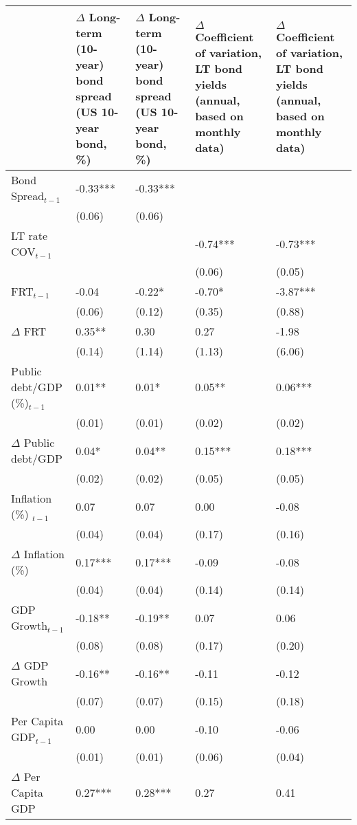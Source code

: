 \begingroup\tiny
\begin{tabular}{lp{3cm}p{3cm}p{3cm}p{3cm}}
  \hline
 & $\Delta$ Long-term (10-year) bond spread (US 10-year bond, \%) & $\Delta$ Long-term (10-year) bond spread (US 10-year bond, \%) & $\Delta$ Coefficient of variation, LT bond yields (annual, based on monthly data) & $\Delta$ Coefficient of variation, LT bond yields (annual, based on monthly data) \\ 
  \hline
Bond Spread$_{t-1}$ & -0.33*** & -0.33*** &  &  \\ 
   & (0.06) & (0.06) &  &  \\ 
  LT rate COV$_{t-1}$ &  &  & -0.74*** & -0.73*** \\ 
   &  &  & (0.06) & (0.05) \\ 
  FRT$_{t-1}$ & -0.04 & -0.22* & -0.70* & -3.87*** \\ 
   & (0.06) & (0.12) & (0.35) & (0.88) \\ 
  $\Delta$ FRT & 0.35** & 0.30 & 0.27 & -1.98 \\ 
   & (0.14) & (1.14) & (1.13) & (6.06) \\ 
  Public debt/GDP (\%)$_{t-1}$ & 0.01** & 0.01* & 0.05** & 0.06*** \\ 
   & (0.01) & (0.01) & (0.02) & (0.02) \\ 
  $\Delta$ Public debt/GDP & 0.04* & 0.04** & 0.15*** & 0.18*** \\ 
   & (0.02) & (0.02) & (0.05) & (0.05) \\ 
  Inflation (\%) $_{t-1}$ & 0.07 & 0.07 & 0.00 & -0.08 \\ 
   & (0.04) & (0.04) & (0.17) & (0.16) \\ 
  $\Delta$ Inflation (\%) & 0.17*** & 0.17*** & -0.09 & -0.08 \\ 
   & (0.04) & (0.04) & (0.14) & (0.14) \\ 
  GDP Growth$_{t-1}$ & -0.18** & -0.19** & 0.07 & 0.06 \\ 
   & (0.08) & (0.08) & (0.17) & (0.20) \\ 
  $\Delta$ GDP Growth & -0.16** & -0.16** & -0.11 & -0.12 \\ 
   & (0.07) & (0.07) & (0.15) & (0.18) \\ 
  Per Capita GDP$_{t-1}$ & 0.00 & 0.00 & -0.10 & -0.06 \\ 
   & (0.01) & (0.01) & (0.06) & (0.04) \\ 
  $\Delta$ Per Capita GDP & 0.27*** & 0.28*** & 0.27 & 0.41 \\ 

\end{tabular}
